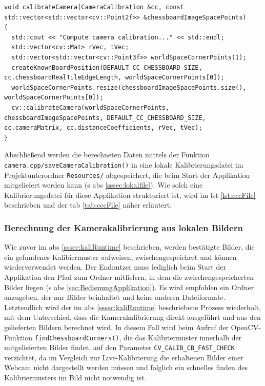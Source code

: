 \begin{lstlisting}[caption={Die Funktion \texttt{camera.cpp/calibrateCamera();} berechnet anhand von übergebenen 2D-Bildpunkten eines Kalibriermusters die intrinsischen und extrinsischen Kameraparameter}, label={lst:calibrateCamera}]
void calibrateCamera(CameraCalibration &cc, const std::vector<std::vector<cv::Point2f>> &chessboardImageSpacePoints)
{
  std::cout << "Compute camera calibration..." << std::endl;
  std::vector<cv::Mat> rVec, tVec;
  std::vector<std::vector<cv::Point3f>> worldSpaceCornerPoints(1);
  createKnownBoardPosition(DEFAULT_CC_CHESSBOARD_SIZE, cc.chessboardRealTileEdgeLength, worldSpaceCornerPoints[0]);
  worldSpaceCornerPoints.resize(chessboardImageSpacePoints.size(), worldSpaceCornerPoints[0]);
  cv::calibrateCamera(worldSpaceCornerPoints, chessboardImageSpacePoints, DEFAULT_CC_CHESSBOARD_SIZE, cc.cameraMatrix, cc.distanceCoefficients, rVec, tVec);
}
\end{lstlisting}

\noindent Abschließend werden die berechneten Daten mittels der Funktion \texttt{camera.cpp/saveCameraCalibration()} in eine lokale Kalibrierungsdatei im Projektunterordner \glqq \texttt{Resources/}\grqq{} abgespeichert, die beim Start der Applikation mitgeliefert werden kann (\acs{s} \acs{abs} \ref{sssec:lokalfile}). Wie solch eine Kalibrierungsdatei für diese Applikation strukturiert ist, wird im \acs{lst} \ref{lst:cccFile} beschrieben und der \acs{tab} \ref{tab:cccFile} näher erläutert.

\subsubsection{Berechnung der Kamerakalibrierung aus lokalen Bildern}\label{sssec:lokalkali}
Wie zuvor im \acs{abs} \ref{sssec:kaliRuntime} beschrieben, werden bestätigte Bilder, die ein gefundenes Kalibiermuster aufweisen, zwischengespeichert und können wiederverwendet werden. Der Endnutzer muss lediglich beim Start der Applikation den Pfad zum Ordner mitliefern, in dem die zwischengespeicherten Bilder liegen (\acs{s} \acs{abs} \ref{sec:BedienungApplikation}). Es wird empfohlen ein Ordner anzugeben, der nur Bilder beinhaltet und keine anderen Dateiformate. Letztendlich wird der im \acs{abs} \ref{sssec:kaliRuntime} beschriebene Prozess wiederholt, mit dem Unterschied, dass die Kamerakalibrierung direkt ausgeführt und aus den gelieferten Bildern berechnet wird. In diesem Fall wird beim Aufruf der OpenCV-Funktion \texttt{findChessboardCorners()}, die das Kalibriermuster innerhalb der mitgelieferten Bilder findet, auf den Parameter \texttt{CV\_CALIB\_CB\_FAST\_CHECK} verzichtet, da im Vergleich zur Live-Kalibrierung die erhaltenen Bilder einer Webcam nicht dargestellt werden müssen und folglich ein schnelles finden des Kalibriermusters im Bild nicht notwendig ist.

